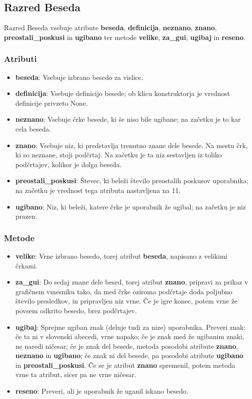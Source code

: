 \documentclass [a4paper, 12pt] {article}
\begin{document}
\subsection {Razred Beseda}
Razred Beseda vsebuje atribute \textbf {beseda}, \textbf {definicija}, \textbf {neznano}, \textbf {znano}, \textbf {preostali\_poskusi} in \textbf {ugibano} ter metode \textbf {velike}, \textbf {za\_gui}, \textbf {ugibaj} in \textbf {reseno}.
\subsubsection {Atributi}
\begin {itemize}
\item \textbf {beseda}: Vsebuje izbrano besedo za vislice.
\item \textbf {definicija}: Vsebuje definicijo besede; ob klicu konstruktorja je vrednost definicije privzeto None.
\item \textbf {neznano}: Vsebuje črke besede, ki še niso bile ugibane; na začetku je to kar cela beseda. 
\item \textbf {znano}: Vsebuje niz, ki predstavlja trenutno znane dele besede. Na mestu črk, ki so neznane, stoji podčrtaj. Na začetku je ta niz sestavljen iz toliko podčrtajev, kolikor je dolga beseda.
\item \textbf {preostali\_poskusi}: Števec, ki beleži število preostalih poskusov uporabnika; na začetku je vrednost tega atributa nastavljena na 11. 
\item \textbf {ugibano}: Niz, ki beleži, katere črke je uporabnik že ugibal; na začetku je niz prazen.
\end {itemize}
\subsubsection {Metode}
\begin {itemize}
\item \textbf {velike}: Vrne izbrano besedo, torej atribut \textbf {beseda}, napisano z velikimi črkami.
\item \textbf {za\_gui}: Do sedaj znane dele besed, torej atribut \textbf {znano}, pripravi za prikaz v grafičnem vmesniku tako, da med črke oziroma podčrtaje doda poljubno število presledkov, in pripravljen niz vrne. Če je igre konec, potem vrne že povsem odkrito besedo, brez podčrtajev. 
\item \textbf{ugibaj}: Sprejme ugiban znak (deluje tudi za nize) uporabnika. Preveri znak: če ta ni v slovenski abecedi, vrne napako; če je znak med že ugibanim znaki, ne naredi ničesar; če je znak del besede, metoda posodobi atribute \textbf {znano}, \textbf {neznano} in \textbf {ugibano}; če znak ni del besede, pa posodobi atribute \textbf {ugibano} in \textbf {preostali\_poskusi}. Če se je atribut \textbf {znano} spremenil, potem metoda vrne ta atribut, sicer pa ne vrne ničesar. 
\item \textbf{reseno}: Preveri, ali je uporabnik že uganil iskano besedo.
\end {itemize}
\end{document}
